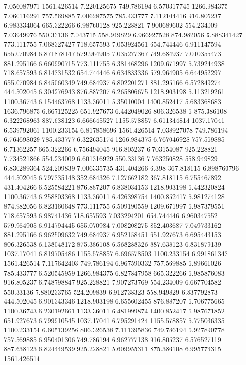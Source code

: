 7.056087971 	1561.426514
7.220125675	 749.786194
6.570317745	1266.984375
7.060116291 	757.569885
7.006287575 	785.433777
7.112104416 	916.805237
6.983334064	665.322266
6.98760128	925.228821
7.900689602	 554.234009
7.03949976	550.33136
7.043715	558.949829
6.966927528	874.982056
6.888341427	773.111755
7.068327427 	718.657593
7.053924561 	654.744446
6.911147594	655.070984
6.871878147	579.964905
7.035277367	 749.684937
7.010355473 	881.295166
6.660990715	773.111755
6.381468296	1209.671997
6.739244938	718.657593
6.814331532	654.744446
6.634833336	579.964905
6.644952297	655.070984
6.845060349	749.684937
6.802201271	881.295166
6.572849274	444.502045
6.304276943	876.887207
6.265806675	1218.903198
6.113219261	1100.36743
6.154463768	1133.36011
5.35010004	1400.852417
5.683368683	1636.796875
6.667125225	651.927673
6.442049026	806.326538
6	875.386108
6.322268963	887.638123
6.666645527	1155.578857
6.611344814	1037.17041
6.539792061	1100.233154
6.817858696	1561.426514
7.038927078 	749.786194
6.764698029	785.433777
6.322635174	1266.984375
6.767046928	757.569885
6.71362257	 665.322266
6.756494045	916.805237
6.703154087	925.228821
7.734521866 	554.234009
6.601316929	550.33136
7.763250828	 558.949829
6.830289364	524.209839
7.006335735	 431.404266
6.398	367.818115
6.898760796	444.502045
6.797335148	352.684326
7.127662182	367.818115
6.755467892	431.404266
6.525584221	876.887207
6.838034153	1218.903198
6.442320824	1100.36743
6.258803368	1133.36011
6.426398754	1400.852417
6.981274128	874.982056
6.823160648	773.111755
6.509190559	1209.671997
6.987379551	718.657593
6.98741436	718.657593
7.033294201	654.744446
6.960347652	579.964905
6.914794445	655.070984
7.008208275	852.403687
7.049733162	881.295166
6.962509632	749.684937
6.952158451	651.927673
6.695443153	806.326538
6.138048172	875.386108
6.568288326	887.638123
6.831879139	1037.17041
6.819705486	1155.578857
6.696578503	1100.233154
6.991861343	1561.426514
7.117642403	749.786194
6.967590332	757.569885
6.89661026	785.433777
6.520545959	1266.984375
6.827847958	665.322266
6.985876083	916.805237
6.748798847	925.228821
7.907273769	554.234009
6.667704582	550.33136
7.880233765	524.209839
6.912738323	558.949829
6.837792873	444.502045
6.901343346	1218.903198
6.655602455	876.887207
6.706775665	1100.36743
6.230192661	1133.36011
6.481999874	1400.852417
6.987671852	651.927673
6.799910545	1037.17041
6.795291424	1155.578857
6.775036335	1100.233154
6.605139256	806.326538
7.111395836	749.786194
6.927890778	757.569885
6.950401306	749.786194
6.962777138	916.805237
6.576527119	887.638123
6.824449539	925.228821
5.609955311	875.386108
6.995773315	1561.426514
